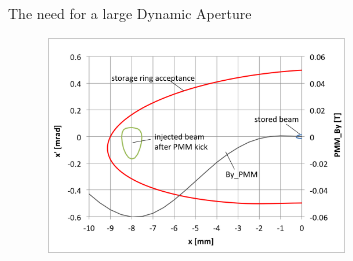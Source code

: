 \documentclass[aspectratio=169]{beamer}
\begin{document}
\begin{frame}{The need for a large Dynamic Aperture}
        \begin{figure}
            \includegraphics[width=0.7\textwidth]{nlk_phase_space.png}
        \end{figure}
\end{frame}
\end{document}
